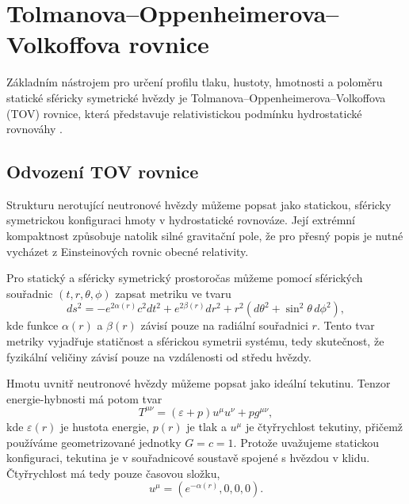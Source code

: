 \documentclass[%
final%
,htext%
]{ipothes}
\begin{document}
\section{Tolmanova--Oppenheimerova--Volkoffova rovnice}

Základním nástrojem pro určení profilu tlaku, hustoty, hmotnosti a poloměru statické sféricky symetrické hvězdy je Tolmanova--\allowbreak{}Oppenheimerova--\allowbreak{}Volkoffova (TOV) rovnice, která představuje relativistickou podmínku hydrostatické rovnováhy \cite{ghosh2007}.

\subsection{Odvození TOV rovnice}

Strukturu nerotující neutronové hvězdy můžeme popsat jako statickou, sféricky symetrickou konfiguraci hmoty v hydrostatické rovnováze. Její extrémní kompaktnost způsobuje natolik silné gravitační pole, že pro přesný popis je nutné vycházet z Einsteinových rovnic obecné relativity.

Pro statický a sféricky symetrický prostoročas můžeme pomocí sférických souřadnic $(t, r, \theta, \phi)$ zapsat metriku ve tvaru
\begin{equation}
    ds^2 =
    - e^{2\alpha(r)} c^2 dt^2
    + e^{2\beta(r)} dr^2
    + r^2 \left(d\theta^2 + \sin^2\theta \, d\phi^2\right),
    \label{eq:tov_metric}
\end{equation}
kde funkce $\alpha(r)$ a $\beta(r)$ závisí pouze na radiální souřadnici $r$. Tento tvar metriky vyjadřuje statičnost a sférickou symetrii systému, tedy skutečnost, že fyzikální veličiny závisí pouze na vzdálenosti od středu hvězdy.

Hmotu uvnitř neutronové hvězdy můžeme popsat jako ideální tekutinu. Tenzor energie-hybnosti má potom tvar
\begin{equation}
    T^{\mu\nu}
    =
    \left(\varepsilon + p\right) u^\mu u^\nu
    + p g^{\mu\nu},
    \label{eq:perfect_fluid_tensor}
\end{equation}
kde $\varepsilon(r)$ je hustota energie, $p(r)$ je tlak a $u^\mu$ je čtyřrychlost tekutiny, přičemž používáme geometrizované jednotky $G=c=1$. Protože uvažujeme statickou konfiguraci, tekutina je v souřadnicové soustavě spojené s hvězdou v klidu. Čtyřrychlost má tedy pouze časovou složku,
\begin{equation}
    u^\mu = \left(e^{-\alpha(r)},0,0,0\right).
    \label{eq:four_velocity}
\end{equation}
\end{document}

